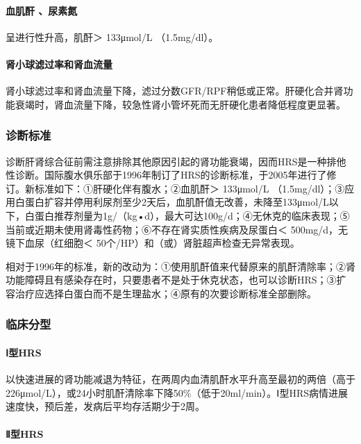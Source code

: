 \paragraph{血肌酐 、尿素氮}

呈进行性升高，肌酐＞ 133μmol/L （1.5mg/dl）。

\paragraph{肾小球滤过率和肾血流量}

肾小球滤过率和肾血流量下降，滤过分数GFR/RPF稍低或正常。肝硬化合并肾功能衰竭时，肾血流量下降，较急性肾小管坏死而无肝硬化患者降低程度更显著。

\subsubsection{诊断标准}

诊断肝肾综合征前需注意排除其他原因引起的肾功能衰竭，因而HRS是一种排他性诊断。国际腹水俱乐部于1996年制订了HRS的诊断标准，于2005年进行了修订。新标准如下：①肝硬化伴有腹水；②血肌酐＞
133μmol/L
（1.5mg/dl）；③应用白蛋白扩容并停用利尿剂至少2天后，血肌酐值无改善，未降至133μmol/L以下，白蛋白推荐剂量为1g/（kg•d），最大可达100g/d；④无休克的临床表现；⑤当前或近期未使用肾毒性药物；⑥不存在肾实质性疾病及尿蛋白＜
500mg/d，无镜下血尿（红细胞＜ 50个/HP）和（或）肾脏超声检查无异常表现。

相对于1996年的标准，新的改动为：①使用肌酐值来代替原来的肌酐清除率；②肾功能障碍且有感染存在时，只要患者不是处于休克状态，也可以诊断HRS；③扩容治疗应选择白蛋白而不是生理盐水；④原有的次要诊断标准全部删除。

\subsubsection{临床分型}

\paragraph{Ⅰ型HRS}

以快速进展的肾功能减退为特征，在两周内血清肌酐水平升高至最初的两倍（高于226μmol/L），或24小时肌酐清除率下降50\%（低于20ml/min）。Ⅰ型HRS病情进展速度快，预后差，发病后平均存活期少于2周。

\paragraph{Ⅱ型HRS}

